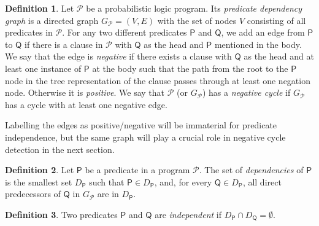 \documentclass[letterpaper]{article}
\theoremstyle{definition}
\newtheorem{definition}{Definition}
\begin{document}
\begin{definition}
  Let $\mathscr{P}$ be a probabilistic logic program. Its \emph{predicate
    dependency graph} is a directed graph $G_{\mathscr{P}} = (V, E)$ with the
  set of nodes $V$ consisting of all predicates in $\mathscr{P}$. For any two
  different predicates $\mathsf{P}$ and $\mathsf{Q}$, we add an edge from
  $\mathsf{P}$ to $\mathsf{Q}$ if there is a clause in $\mathscr{P}$ with
  $\mathsf{Q}$ as the head and $\mathsf{P}$ mentioned in the body. We say that
  the edge is \emph{negative} if there exists a clause with $\mathsf{Q}$ as the
  head and at least one instance of $\mathsf{P}$ at the body such that the path
  from the root to the $\mathsf{P}$ node in the tree representation of the
  clause passes through at least one negation node. Otherwise it is
  \emph{positive}. We say that $\mathscr{P}$ (or $G_{\mathscr{P}}$) has a
  \emph{negative cycle} if $G_{\mathscr{P}}$ has a cycle with at least one
  negative edge.
\end{definition}

Labelling the edges as positive/negative will be immaterial for predicate
independence, but the same graph will play a crucial role in negative cycle
detection in the next section.

\begin{definition}
  Let $\mathsf{P}$ be a predicate in a program $\mathscr{P}$. The set of
  \emph{dependencies} of $\mathsf{P}$ is the smallest set $D_{\mathsf{P}}$ such
  that $\mathsf{P} \in D_{\mathsf{P}}$, and, for every $\mathsf{Q} \in
  D_{\mathsf{P}}$, all direct predecessors of $\mathsf{Q}$ in $G_{\mathscr{P}}$
  are in $D_{\mathsf{P}}$.
\end{definition}

\begin{definition}
  Two predicates $\mathsf{P}$ and $\mathsf{Q}$ are \emph{independent} if
  $D_{\mathsf{P}} \cap D_{\mathsf{Q}} = \emptyset$.
\end{definition}
\end{document}
